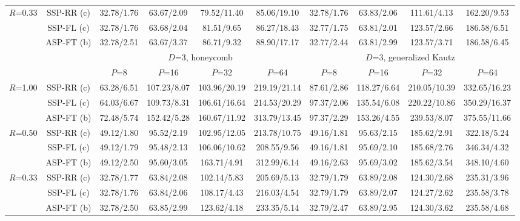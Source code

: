 \documentclass[10pt,twocolumn,journal]{IEEEtran}
\begin{document}
\begin{table*}[t!]
{\begin{tabular}{|c|c|c|c|c|c|c|c|c|c|}
\multirow{3}{*}{$R$=0.33} & SSP-RR (c) & \cellcolor[gray]{0.7} 32.78/1.76 & 63.67/2.09 & 79.52/11.40 & 85.06/19.10 & 32.78/1.76 & 63.83/2.06 & 111.61/4.13 & 162.20/9.53 \\
& SSP-FL (c) & \cellcolor[gray]{0.7} 32.78/1.76 & 63.68/2.04 & 81.51/9.65 & 86.27/18.43 & \cellcolor[gray]{0.7} 32.77/1.75 & 63.81/2.01 & 123.57/2.66 & 186.58/6.51 \\
& ASP-FT (b) & 32.78/2.51 & 63.67/3.37 & 86.71/9.32 & 88.90/17.17 & 32.77/2.44 & 63.81/2.99 & 123.57/3.71 & 186.58/6.45 \\
\hline
\hline
& 	 & \multicolumn{4}{c|}{$D$=3, honeycomb} & \multicolumn{4}{c|}{$D$=3, generalized Kautz} \\
\hline
& 	 & $P$=8 & $P$=16 & $P$=32 & $P$=64 & $P$=8 & $P$=16 & $P$=32 & $P$=64 \\
\hline
\multirow{3}{*}{$R$=1.00} & SSP-RR (c) & 63.28/6.51 & 107.23/8.07 & 103.96/20.19 & \cellcolor[gray]{0.8} 219.19/21.14 & 87.61/2.86 & 118.27/6.64 & 210.05/10.39 & 332.65/16.23 \\
& SSP-FL (c) & 64.03/6.67 & 109.73/8.31 & 106.61/16.64 & 214.53/20.29 & 97.37/2.06 & 135.54/6.08 & 220.22/10.86 & \cellcolor[gray]{0.8} 350.29/16.37 \\
& ASP-FT (b) & 72.48/5.74 & 152.42/5.28 & 160.67/11.92 & \cellcolor[gray]{0.9} 313.79/13.45 & 97.37/2.29 & 153.26/4.55 & 239.53/8.07 & \cellcolor[gray]{0.9} 375.55/11.66 \\
\hline
\multirow{3}{*}{$R$=0.50} & SSP-RR (c) & 49.12/1.80 & 95.52/2.19 & 102.95/12.05 & 213.78/10.75 & 49.16/1.81 & 95.63/2.15 & 185.62/2.91 & 322.18/5.24 \\
& SSP-FL (c) & 49.12/1.79 & 95.48/2.13 & 106.06/10.62 & 208.55/9.56 & 49.16/1.81 & 95.69/2.10 & 185.68/2.76 & 346.34/4.32 \\
& ASP-FT (b) & 49.12/2.50 & 95.60/3.05 & 163.71/4.91 & 312.99/6.14 & 49.16/2.63 & 95.69/3.02 & 185.62/3.54 & 348.10/4.60 \\
\hline
\multirow{3}{*}{$R$=0.33} & SSP-RR (c) & 32.78/1.77 & 63.84/2.08 & 102.14/5.83 & 205.69/5.13 & \cellcolor[gray]{0.7} 32.79/1.79 & 63.89/2.08 & 124.30/2.68 & 235.31/3.96 \\
& SSP-FL (c) & \cellcolor[gray]{0.7} 32.78/1.76 & 63.84/2.06 & 108.17/4.43 & 216.03/4.54 & \cellcolor[gray]{0.7} 32.79/1.79 & 63.89/2.07 & 124.27/2.62 & 235.58/3.78 \\
& ASP-FT (b) & 32.78/2.50 & 63.85/2.99 & 123.62/4.18 & 233.35/5.14 & 32.79/2.47 & 63.89/2.95 & 124.30/3.62 & 235.58/4.68 \\

\end{tabular}}
\end{table*}
\end{document}
